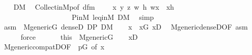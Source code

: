 \begin{isabellebody}
\isanewline
\ \ \isamarkupfalse%
\ {\isachardoublequoteopen}{\isacharquery}{\kern0pt}D{\isasymin}M{\isachardoublequoteclose}\ \isamarkupfalse%
\ Collect{\isacharunderscore}{\kern0pt}in{\isacharunderscore}{\kern0pt}M{\isacharunderscore}{\kern0pt}{}p{\isacharbrackleft}{\kern0pt}of\ {\isacharquery}{\kern0pt}d{\isacharunderscore}{\kern0pt}fm\ {\isacharunderscore}{\kern0pt}\ {\isacharunderscore}{\kern0pt}\ {\isacharunderscore}{\kern0pt}\ {\isacharunderscore}{\kern0pt}\ {\isacharunderscore}{\kern0pt}{\isachardoublequoteopen}{\isasymlambda}x\ y\ z\ w\ h{\isachardot}{\kern0pt}\ w{\isasymbottom}x\ {\isasymor}\ x{\isasymin}h{\isachardoublequoteclose}{\isacharbrackright}{\kern0pt}\ \isanewline
\ \ \ \ \ \ \ \ \ \ \ \ \ \ \ \ \ \ \ \ P{\isacharunderscore}{\kern0pt}in{\isacharunderscore}{\kern0pt}M\ leq{\isacharunderscore}{\kern0pt}in{\isacharunderscore}{\kern0pt}M\ {\isacartoucheopen}D{\isasymin}M{\isacartoucheclose}\ \isamarkupfalse%
\ simp\isanewline
\ \ \isamarkupfalse%
\ asm\ {\isacharequal}{\kern0pt}\ {\isacartoucheopen}M{\isacharunderscore}{\kern0pt}generic{\isacharparenleft}{\kern0pt}G{\isacharparenright}{\kern0pt}{\isacartoucheclose}\ {\isacartoucheopen}dense{\isacharparenleft}{\kern0pt}{\isacharquery}{\kern0pt}D{\isacharparenright}{\kern0pt}{\isacartoucheclose}\ {\isacartoucheopen}{\isacharquery}{\kern0pt}D{\isasymsubseteq}P{\isacartoucheclose}\ {\isacartoucheopen}{\isacharquery}{\kern0pt}D{\isasymin}M{\isacartoucheclose}\isanewline
\ \ \isamarkupfalse%
\ x\ \ {\isachardoublequoteopen}x{\isasymin}G{\isachardoublequoteclose}\ {\isachardoublequoteopen}x{\isasymin}{\isacharquery}{\kern0pt}D{\isachardoublequoteclose}\ \isamarkupfalse%
\ M{\isacharunderscore}{\kern0pt}generic{\isacharunderscore}{\kern0pt}denseD{\isacharbrackleft}{\kern0pt}OF\ asm{\isacharbrackright}{\kern0pt}\isanewline
\ \ \ \ \isamarkupfalse%
\ force\ \isanewline
\ \ \isamarkupfalse%
\ \isamarkupfalse%
\ this\ \ {\isacartoucheopen}M{\isacharunderscore}{\kern0pt}generic{\isacharparenleft}{\kern0pt}G{\isacharparenright}{\kern0pt}{\isacartoucheclose}\isanewline
\ \ \isamarkupfalse%
\ {\isachardoublequoteopen}x{\isasymin}D{\isachardoublequoteclose}\isanewline
\ \ \ \ \isamarkupfalse%
\ M{\isacharunderscore}{\kern0pt}generic{\isacharunderscore}{\kern0pt}compatD{\isacharbrackleft}{\kern0pt}OF\ {\isacharunderscore}{\kern0pt}\ {\isacartoucheopen}p{\isasymin}G{\isacartoucheclose}{\isacharcomma}{\kern0pt}\ of\ x{\isacharbrackright}{\kern0pt}\isanewline

\end{isabellebody}
